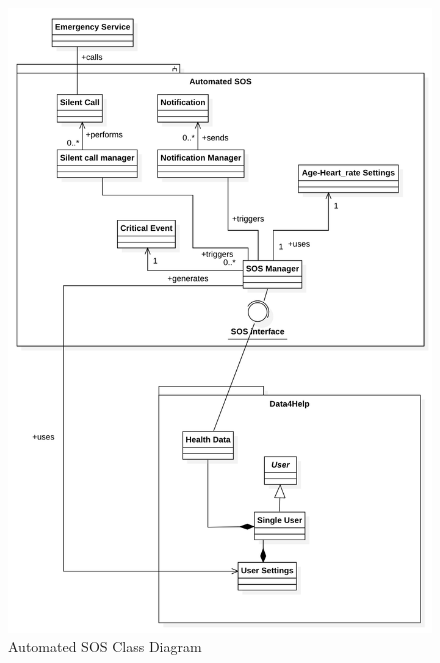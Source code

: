\documentclass[titlepage]{article}
\begin{document}
		\begin{figure}[ht]
			\center
  			\includegraphics[width=\textwidth]{Diagrammi/SOSClass.png}
  			\caption{Automated SOS Class Diagram}
 			\label{fig:SOSClass}
		\end{figure}
\end{document}
